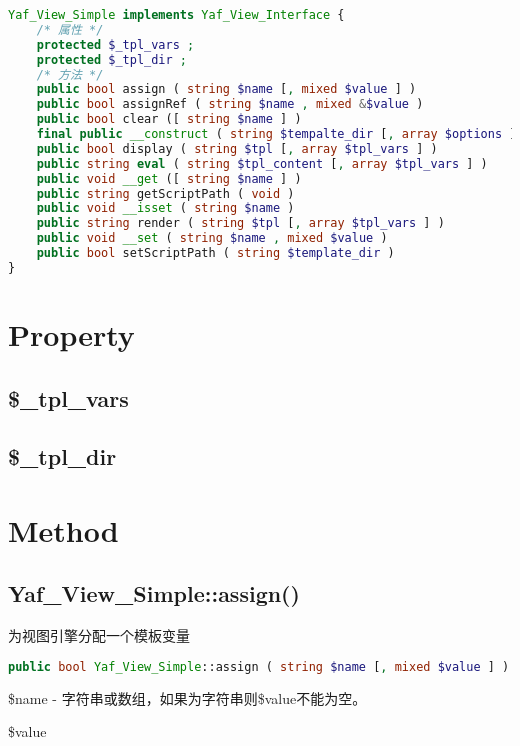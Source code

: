 \begin{lstlisting}[language=PHP]
Yaf_View_Simple implements Yaf_View_Interface {
    /* 属性 */
    protected $_tpl_vars ;
    protected $_tpl_dir ;
    /* 方法 */
    public bool assign ( string $name [, mixed $value ] )
    public bool assignRef ( string $name , mixed &$value )
    public bool clear ([ string $name ] )
    final public __construct ( string $tempalte_dir [, array $options ] )
    public bool display ( string $tpl [, array $tpl_vars ] )
    public string eval ( string $tpl_content [, array $tpl_vars ] )
    public void __get ([ string $name ] )
    public string getScriptPath ( void )
    public void __isset ( string $name )
    public string render ( string $tpl [, array $tpl_vars ] )
    public void __set ( string $name , mixed $value )
    public bool setScriptPath ( string $template_dir )
}
\end{lstlisting}

\section{Property}


\subsection{\$\_tpl\_vars}


\subsection{\$\_tpl\_dir}


\section{Method}


\subsection{Yaf\_View\_Simple::assign()}

为视图引擎分配一个模板变量

\begin{lstlisting}[language=PHP]
public bool Yaf_View_Simple::assign ( string $name [, mixed $value ] )
\end{lstlisting}

\begin{compactitem}
\item \$name - 字符串或数组，如果为字符串则\$value不能为空。

\item \$value
\end{compactitem}



